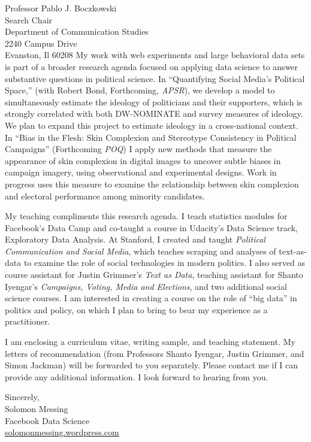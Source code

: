 \documentclass[fontsize=12pt, paper=a4]{scrlttr2}
\begin{document}
\begin{letter}{Professor Pablo J. Boczkowski\\
Search Chair\\
Department of Communication Studies\\
2240 Campus Drive\\
Evanston, Il 60208}
My work with web experiments and large behavioral data sets is part of a broader research agenda focused on applying data science to answer substantive questions in political science.  In ``Quantifying Social Media's Political Space,'' (with Robert Bond, Forthcoming, \emph{APSR}), we develop a model to simultaneously estimate the ideology of politicians and their supporters, which is strongly correlated with both DW-NOMINATE and survey measures of ideology.  We plan to expand this project to estimate ideology in a cross-national context.  In ``Bias in the Flesh: Skin Complexion and Stereotype Consistency in Political Campaigns'' (Forthcoming \emph{POQ}) I apply new methods that measure the appearance of skin complexion in digital images to uncover subtle biases in campaign imagery, using observational and experimental designs.  Work in progress uses this measure to examine the relationship between skin complexion and electoral performance among minority candidates.  

My teaching compliments this research agenda.  I teach statistics modules for Facebook's Data Camp and co-taught a course in Udacity's Data Science track, Exploratory Data Analysis.  At Stanford, I created and taught \emph{Political Communication and Social Media}, which teaches scraping and analyses of text-as-data to examine the role of social technologies in modern politics.  I also served as course assistant for Justin Grimmer's \emph{Text as Data}, teaching assistant for Shanto Iyengar's \emph{Campaigns, Voting, Media and Elections}, and two additional social science courses.  I am interested in creating a course on the role of ``big data'' in politics and policy, on which I plan to bring to bear my experience as a practitioner.  

I am enclosing a curriculum vitae, writing sample, and teaching statement. My letters of recommendation (from Professors Shanto Iyengar, Justin Grimmer, and Simon Jackman) will be forwarded to you separately. Please contact me if I can provide any additional information. I look forward to hearing from you.

\enlargethispage{6\baselineskip}

\closing{
Sincerely, \\
Solomon Messing\\
Facebook Data Science \\
 \url{solomonmessing.wordpress.com}
}

\end{letter}

%
%
\end{document}
